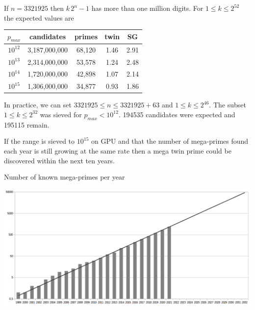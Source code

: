 \documentclass[a4paper, 12pt]{article}
\newcommand\T{\rule{0pt}{2.6ex}}
\newcommand\B{\rule[-1.4ex]{0pt}{0pt}}
\theoremstyle{plain}
\theoremstyle{definition}
\begin{document}
If $n = 3321925$ then $k\,2^n - 1$ has more than one million digits.
For $1 \leq k \leq 2^{52}$ the expected values are
\begin{center}
\begin{tabular}{ccccc}
$p_{max}$ & candidates & primes & twin & SG \B\\
\hline \T
$10^{12}$ & 3,187,000,000 & 68,120 & 1.46 & 2.91 \B \\
$10^{13}$ & 2,314,000,000 & 53,578 & 1.24 & 2.48 \B \\
$10^{14}$ & 1,720,000,000 & 42,898 & 1.07 & 2.14 \B \\
$10^{15}$ & 1,306,000,000 & 34,877 & 0.93 & 1.86
\end{tabular}
\bigskip
\end{center}

In practice, we can set $3321925 \leq n \leq 3321925 + 63$ and $1 \leq k \leq 2^{46}$.
The subset $1 \leq k \leq 2^{32}$ was sieved for $p_{max} < 10^{12}$. 194535 candidates
were expected and 195115 remain. 

\medskip

If the range is sieved to $10^{15}$ on GPU and that the number of mega-primes found
each year is still growing at the same rate then a mega twin prime could be discovered
within the next ten years.

\begin{center}
Number of known mega-primes per year
\par\nobreak
\smallskip
\includegraphics[scale=1.6]{mega_year.png}
\end{center}
\end{document}
